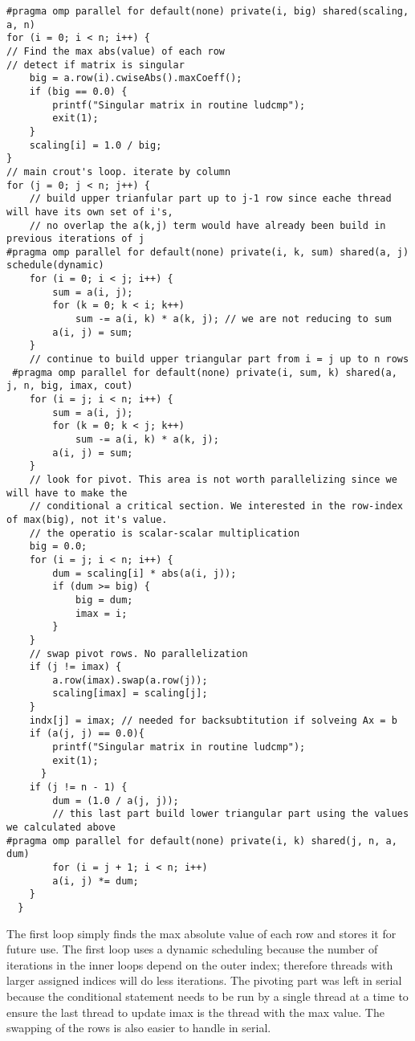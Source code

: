 \documentclass[12pt,letterpaper]{article}
\begin{document}
     \begin{lstlisting}
#pragma omp parallel for default(none) private(i, big) shared(scaling, a, n)
for (i = 0; i < n; i++) {
// Find the max abs(value) of each row
// detect if matrix is singular
    big = a.row(i).cwiseAbs().maxCoeff();
    if (big == 0.0) {
        printf("Singular matrix in routine ludcmp");
        exit(1);
    }
    scaling[i] = 1.0 / big;
}
// main crout's loop. iterate by column
for (j = 0; j < n; j++) {
    // build upper trianfular part up to j-1 row since eache thread will have its own set of i's,
    // no overlap the a(k,j) term would have already been build in previous iterations of j
#pragma omp parallel for default(none) private(i, k, sum) shared(a, j) schedule(dynamic)
  	for (i = 0; i < j; i++) {
  		sum = a(i, j);
  		for (k = 0; k < i; k++)
  			sum -= a(i, k) * a(k, j); // we are not reducing to sum
  		a(i, j) = sum;
  	}
  	// continue to build upper triangular part from i = j up to n rows
 #pragma omp parallel for default(none) private(i, sum, k) shared(a, j, n, big, imax, cout)
  	for (i = j; i < n; i++) {
  		sum = a(i, j);
  		for (k = 0; k < j; k++)
  			sum -= a(i, k) * a(k, j);
  		a(i, j) = sum;
  	}
  	// look for pivot. This area is not worth parallelizing since we will have to make the
  	// conditional a critical section. We interested in the row-index of max(big), not it's value.
  	// the operatio is scalar-scalar multiplication
  	big = 0.0;
  	for (i = j; i < n; i++) {
  		dum = scaling[i] * abs(a(i, j));
  		if (dum >= big) {
  			big = dum;
  			imax = i;
  		}
  	}
  	// swap pivot rows. No parallelization
  	if (j != imax) {
  		a.row(imax).swap(a.row(j));
  		scaling[imax] = scaling[j];
  	}
  	indx[j] = imax; // needed for backsubtitution if solveing Ax = b
  	if (a(j, j) == 0.0){
        printf("Singular matrix in routine ludcmp");
        exit(1);
      }
  	if (j != n - 1) {
  		dum = (1.0 / a(j, j));
  		// this last part build lower triangular part using the values we calculated above
#pragma omp parallel for default(none) private(i, k) shared(j, n, a, dum)
  		for (i = j + 1; i < n; i++)
  		a(i, j) *= dum;
  	}
  }
    \end{lstlisting}

The first loop simply finds the max absolute value of each row and stores it for future use. The first loop uses a dynamic scheduling because the number of iterations in the inner loops depend on the outer index; therefore threads with larger assigned indices will do less iterations. The pivoting part was left in serial because the conditional statement needs to be run by a single thread at a time to ensure the last thread to update imax is the thread with the max value. The swapping of the rows is also easier to handle in serial.
\end{document}
